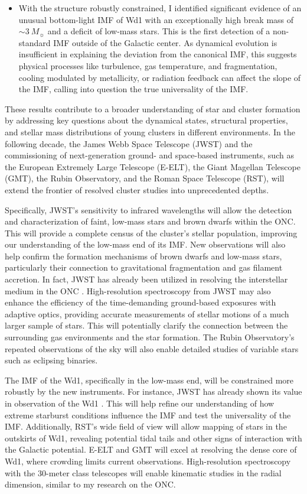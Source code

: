 \documentclass[12pt]{ucsddissertation}
\begin{document}
\begin{CJK*}{UTF8}{gbsn}
\begin{itemize}
    \item With the structure robustly constrained, I identified significant evidence of an unusual bottom-light IMF of Wd1 with an exceptionally high break mass of $\sim 3~M_\sun$ and a deficit of low-mass stars. This is the first detection of a non-standard IMF outside of the Galactic center. As dynamical evolution is insufficient in explaining the deviation from the canonical IMF, this suggests physical processes like turbulence, gas temperature, and fragmentation, cooling modulated by metallicity, or radiation feedback can affect the slope of the IMF, calling into question the true universality of the IMF.
\end{itemize}

These results contribute to a broader understanding of star and cluster formation by addressing key questions about the dynamical states, structural properties, and stellar mass distributions of young clusters in different environments. In the following decade, the James Webb Space Telescope (JWST) and the commissioning of next-generation ground- and space-based instruments, such as the European Extremely Large Telescope (E-ELT), the Giant Magellan Telescope (GMT), the Rubin Observatory, and the Roman Space Telescope (RST), will extend the frontier of resolved cluster studies into unprecedented depths. 

Specifically, JWST's sensitivity to infrared wavelengths will allow the detection and characterization of faint, low-mass stars and brown dwarfs within the ONC. This will provide a complete census of the cluster's stellar population, improving our understanding of the low-mass end of its IMF. New observations will also help confirm the formation mechanisms of brown dwarfs and low-mass stars, particularly their connection to gravitational fragmentation and gas filament accretion. In fact, JWST has already been utilized in resolving the interstellar medium in the ONC \citep[][]{Peeters-2024}. High-resolution spectroscopy from JWST may also enhance the efficiency of the time-demanding ground-based exposures with adaptive optics, providing accurate measurements of stellar motions of a much larger sample of stars. This will potentially clarify the connection between the surrounding gas environments and the star formation.  The Rubin Observatory's repeated observations of the sky will also enable detailed studies of variable stars such as eclipsing binaries.

The IMF of the Wd1, specifically in the low-mass end, will be constrained more robustly by the new instruments. For instance, JWST has already shown its value in observation of the Wd1 \citep[][]{Guarcello-2025}. This will help refine our understanding of how extreme starburst conditions influence the IMF and test the universality of the IMF. Additionally, RST's wide field of view will allow mapping of stars in the outskirts of Wd1, revealing potential tidal tails and other signs of interaction with the Galactic potential. E-ELT and GMT will excel at resolving the dense core of Wd1, where crowding limits current observations. High-resolution spectroscopy with the 30-meter class telescopes will enable kinematic studies in the radial dimension, similar to my research on the ONC.


\end{CJK*}
\end{document}
